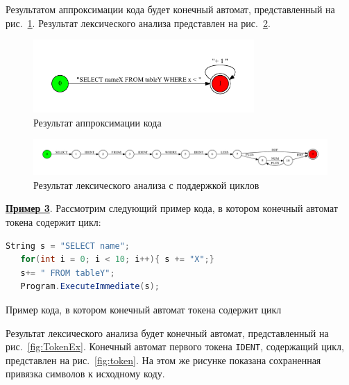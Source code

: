 Результатом аппроксимации кода будет конечный автомат, представленный на рис.~\ref{fig:while_appr}. Результат лексического анализа представлен на рис.~\ref{fig:while_ex}.

\begin{figure}[h!]
\begin{center}
\includegraphics[width=0.75\textwidth]{Polubelova/while_appr}
\caption{Результат аппроксимации кода}
\label{fig:while_appr} 
\end{center}
\end{figure}


\begin{figure}[h!]
\begin{center}
\includegraphics[width=1.0\textwidth]{Polubelova/WhileEx}
\caption{Результат лексического анализа с поддержкой циклов}
\label{fig:while_ex} 
\end{center}
\end{figure}

\textbf{\underline{Пример 3}}. 
Рассмотрим следующий пример кода, в котором конечный автомат токена содержит цикл:

\begin{listing}[H]
    \begin{lstlisting}[language=csharp]
   String s = "SELECT name";
   for(int i = 0; i < 10; i++){ s += "X";}
   s+= " FROM tableY";
   Program.ExecuteImmediate(s);
    \end{lstlisting}
\caption{Пример кода, в котором конечный автомат токена содержит цикл}
\label{lst:example}
\end{listing}

Результат лексического анализа будет конечный автомат, представленный на рис.~\ref{fig:TokenEx}. Конечный автомат первого токена \verb|IDENT|, содержащий цикл, представлен на рис.~\ref{fig:token}. На этом же рисунке показана сохраненная привязка символов к исходному коду. 

